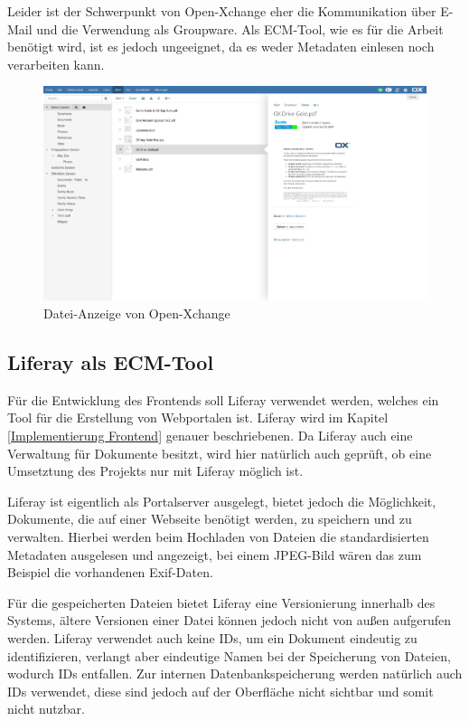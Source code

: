 Leider ist der Schwerpunkt von Open-Xchange eher die Kommunikation \"uber E-Mail und die Verwendung als Groupware. Als \ac{ECM}-Tool, wie es f\"ur die Arbeit ben\"otigt wird, ist es jedoch ungeeignet, da es weder Metadaten einlesen noch verarbeiten kann.

\begin{figure}[!ht]
\centering
\includegraphics[width=16cm]{Bilder/xchange_Oberflaeche.jpg}
\caption{Datei-Anzeige von Open-Xchange}
\label{Xchange Dateianzeige}
\centering
\end{figure}

\FloatBarrier
\subsection{Liferay als ECM-Tool} \label{Liferay}
F\"ur die Entwicklung des Frontends soll Liferay verwendet werden, welches ein Tool f\"ur die Erstellung von Webportalen ist.
Liferay wird im Kapitel \ref{Implementierung Frontend} genauer beschriebenen.
Da Liferay auch eine Verwaltung f\"ur Dokumente besitzt, wird hier nat\"urlich auch gepr\"uft, ob eine Umsetztung des Projekts nur mit Liferay m\"oglich ist.

Liferay ist eigentlich als Portalserver ausgelegt, bietet jedoch die M\"oglichkeit, Dokumente, die auf einer Webseite ben\"otigt werden, zu speichern und zu verwalten. Hierbei werden beim Hochladen von Dateien die standardisierten Metadaten ausgelesen und angezeigt, bei einem JPEG-Bild w\"aren das zum Beispiel die vorhandenen \ac{Exif}-Daten.

F\"ur die gespeicherten Dateien bietet Liferay eine Versionierung innerhalb des Systems, \"altere Versionen einer Datei k\"onnen jedoch nicht von au\ss{}en aufgerufen werden. Liferay verwendet auch keine IDs, um ein Dokument eindeutig zu identifizieren, verlangt aber eindeutige Namen bei der Speicherung von Dateien, wodurch IDs entfallen. Zur internen Datenbankspeicherung werden nat\"urlich auch IDs verwendet, diese sind jedoch auf der Oberfl\"ache nicht sichtbar und somit nicht nutzbar.


